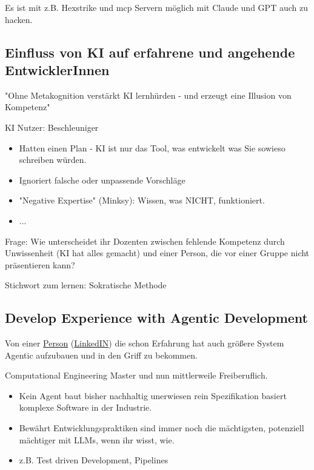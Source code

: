 \documentclass[a4paper]{article}
\begin{document}
Es ist mit z.B. Hexstrike und mcp Servern möglich mit Claude und GPT auch zu hacken.

\subsection{Einfluss von KI auf erfahrene und angehende EntwicklerInnen}

"Ohne Metakognition verstärkt KI lernhürden - und erzeugt eine Illusion von Kompetenz"


KI Nutzer: Beschleuniger

\begin{itemize}
    \item Hatten einen Plan - KI ist nur das Tool, was entwickelt was Sie sowieso schreiben würden.
    \item Ignoriert falsche oder unpassende Vorschläge
    \item "Negative Expertise" (Minksy): Wissen, was NICHT, funktioniert.
    \item ...
\end{itemize}

Frage: Wie unterscheidet ihr Dozenten zwischen fehlende Kompetenz durch Unwissenheit (KI hat alles gemacht) und einer Person, die vor einer Gruppe nicht präsentieren kann? 

Stichwort zum lernen: Sokratische Methode

\subsection{Develop Experience with Agentic Development}

Von einer \href{https://mmkoretz.de/}{Person} (\href{https://de.linkedin.com/in/mario-matthias-koretz}{LinkedIN}) die schon Erfahrung hat auch größere System Agentic aufzubauen und in den Griff zu bekommen.

Computational Engineering Master und nun mittlerweile Freiberuflich.

\begin{itemize}
    \item Kein Agent baut bisher nachhaltig unerwiesen rein Spezifikation basiert komplexe Software in der Industrie.
    \item Bewährt Entwicklungspraktiken sind immer noch die mächtigsten, potenziell mächtiger mit LLMs, wenn ihr wisst, wie.
    \item z.B. Test driven Development, Pipelines
\end{itemize}
\end{document}
